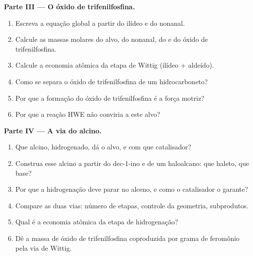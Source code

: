 \begin{problem}
\medskip
\noindent\textbf{Parte III --- O óxido de trifenilfosfina.}
\begin{enumerate}[resume]
  \item Escreva a equação global a partir do ilídeo e do nonanal.
  \item Calcule as massas molares do alvo, do nonanal, do  e do
        óxido de trifenilfosfina.
  \item Calcule a economia atômica da etapa de Wittig (ilídeo + aldeído).
  \item Como se separa o óxido de trifenilfosfina de um hidrocarboneto?
  \item Por que a formação do óxido de trifenilfosfina é a força motriz?
  \item Por que a reação HWE não conviria a este alvo?
\end{enumerate}

\medskip
\noindent\textbf{Parte IV --- A via do alcino.}
\begin{enumerate}[resume]
  \item Que alcino, hidrogenado, dá o alvo, e com que catalisador?
  \item Construa esse alcino a partir do dec-1-ino e de um haloalcano: que haleto, que base?
  \item Por que a hidrogenação deve parar no alceno, e como o catalisador o garante?
  \item Compare as duas vias: número de etapas, controle da geometria, subprodutos.
  \item Qual é a economia atômica da etapa de hidrogenação?
  \item Dê a massa de óxido de trifenilfosfina coproduzida por grama de feromônio pela via de
        Wittig.
\end{enumerate}
\end{problem}
